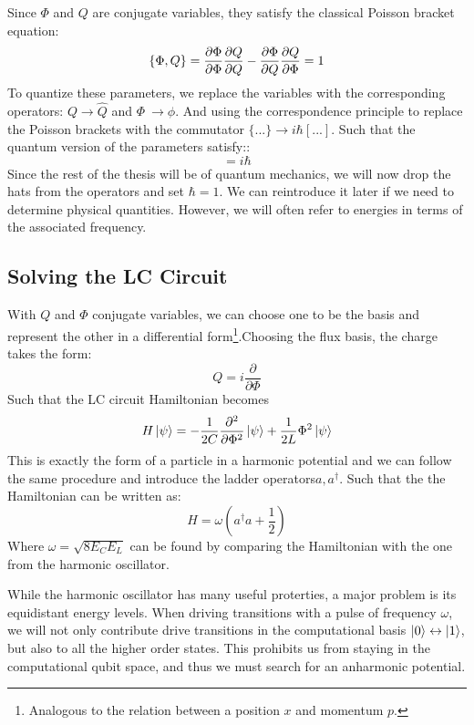 Since $\Phi$ and $Q$ are conjugate variables, they satisfy the classical Poisson bracket equation:
\begin{equation}
    \{ \Phi, Q\} = \frac{\partial \Phi}{\partial \Phi}\frac{\partial Q}{\partial Q} - \frac{\partial \Phi}{\partial Q}\frac{\partial Q}{\partial \Phi} = 1
\end{equation}
To quantize these parameters, we replace the variables with the corresponding operators: $Q \to \hat{Q}$ and $\Phi \ \to \phi$. And using the correspondence principle to replace the Poisson brackets with the commutator $\{...\} \to i\hbar[...]$. Such that the quantum version of the parameters satisfy:\cite{krantz_quantum_2019}:
\begin{equation}
    [\phi, \hat{Q}] = i\hbar
\end{equation}
Since the rest of the thesis will be of quantum mechanics, we will now drop the hats from the operators and set $\hbar = 1$. We can reintroduce it later if we need to determine physical quantities. However, we will often refer to energies in terms of the associated frequency. 

\subsection{Solving the LC Circuit}\label{sec:forming_qubits}
With $Q$ and $\Phi$ conjugate variables, we can choose one to be the basis and represent the other in a differential form\footnote{Analogous to the relation between a position $x$ and momentum $p$.}.Choosing the flux basis, the charge takes the form:
\begin{equation}
    Q = i\frac{\partial}{\partial \Phi}
\end{equation}
Such that the LC circuit Hamiltonian becomes
\begin{equation}
    H \ket{\psi} = - \frac{1}{2C} \frac{\partial^2 }{\partial \Phi^2}\ket{\psi} + \frac{1}{2L} \Phi^2 \ket{\psi}
\end{equation}
This is exactly the form of a particle in a harmonic potential and we can follow the same procedure and introduce the ladder operators$a, a^\dagger$. Such that the the Hamiltonian can be written as:
\begin{equation}
    H = \omega (a^\dagger a + \frac12)
\end{equation}
Where $\omega = \sqrt{8 E_C E_L}$ can be found by comparing the Hamiltonian with the one from the harmonic oscillator.

While the harmonic oscillator has many useful proterties, a major problem is its equidistant energy levels. When driving transitions with a pulse of frequency $\omega$, we will not only contribute drive transitions in the computational basis $\ket{0} \leftrightarrow\ket{1}$, but also to all the higher order states. This prohibits us from staying in the computational qubit space, and thus we must search for an anharmonic potential.

